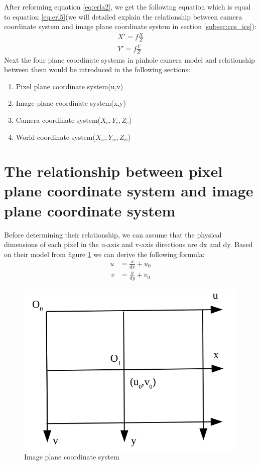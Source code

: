 After reforming equation \ref{eq:erla2}, we get the following equation which is equal to equation \ref{eq:erl5}(we will detailed explain the relationship between camera coordinate system and image plane coordinate system in section \ref{subsec:ccs_ics}):
\begin{equation}\label{eq:erla3}
 \left.\begin{aligned}
        X'=f\frac{X}{Z}\\
        Y'=f\frac{Y}{Z}
       \end{aligned}
 \right.
  \text{}
\end{equation}
Next the four plane coordinate systems in pinhole camera model and relationship between them would be introduced in the following sections:
\begin{enumerate}
\item Pixel plane coordinate system(u,v)
\item Image plane coordinate system(x,y)
\item Camera coordinate system($X_c,Y_c,Z_c$)
\item World coordinate system($X_w,Y_w,Z_w$)
\end{enumerate}

\section{The relationship between pixel plane coordinate system and image plane coordinate system}
Before determining their relationship, we can assume that the physical dimensions of each pixel in the u-axis and v-axis directions are dx and dy. Based on their model from figure \ref{fig:image_cs} we can derive the following formula:\\
\begin{align}\label{eq:erl1}
u & = \frac{x}{dx}+u_0
\end{align}
\begin{align}\label{eq:erl2}
v & = \frac{y}{dy}+v_0
\end{align}

\begin{figure}[h]
\centering
\includegraphics[scale=0.5]{./fig/image_cs.png}
\caption{Image plane coordinate system}
\label{fig:image_cs}
\end{figure}

